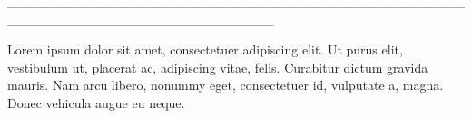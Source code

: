 \pagestyle{indice}

\vspace*{.5cm}

{}

\vspace{.5cm}

{}


\hspace*{-2cm}\_\_\_\_\_\_\_\_\_\_\_\_\_\_\_\_\_\_\_\_\_\_\_\_\_\_\_\_\_\_\_\_\_\_\_\_\_\_\_\_\_\_\_\_\_\_\_\_\_\_\_\_\_\_\_\_\_\_\_\_\_\_\_\_\_\_\_\_\_\_\_\_\_\_\_\_

\vspace{1cm}

\hspace*{-.5cm}\parbox{150pt}{\raggedright Lorem ipsum dolor sit amet, consectetuer
adipiscing elit. Ut purus elit, vestibulum ut,
placerat ac, adipiscing vitae, felis. Curabitur
dictum gravida mauris. Nam arcu libero,
nonummy eget, consectetuer id, vulputate a,
magna. Donec vehicula augue eu neque.} %


